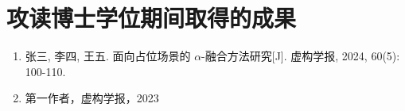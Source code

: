 \chapter{攻读博士学位期间取得的成果}
\begin{enumerate}
\item 张三, 李四, 王五. 面向占位场景的 $\alpha$-融合方法研究[J]. 虚构学报, 2024, 60(5): 100-110.
\item 第一作者，虚构学报，2023
\end{enumerate}
